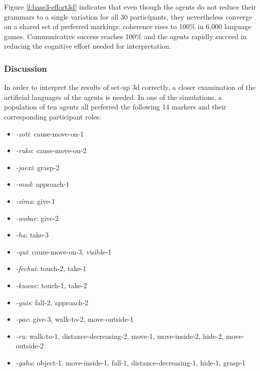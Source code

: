 Figure \ref{f:base3-effort3d} indicates that even though the agents do not reduce their grammars to a single variation for all 30 participants, they nevertheless converge on a shared set of preferred markings: coherence rises to 100\% in 6.000 language games. Communicative success reaches 100\% and the agents rapidly succeed in reducing the cognitive effort needed for interpretation. 


\subsubsection{Discussion}
 In order to interpret the results of set-up 3d correctly, a closer examination of the artificial languages of the agents is needed. In one of the simulations, a population of ten agents all preferred the following 14 markers and their corresponding participant roles:

\begin{itemize}
\item {\em -zoti}: cause-move-on-1
\item {\em -ruko}: cause-move-on-2
\item {\em -jaexi}: grasp-2
\item {\em -mad}: approach-1
\item {\em -zima}: give-1
\item {\em -wobae}: give-2
\item {\em -ha}: take-3
\item {\em -qui}: cause-move-on-3, visible-1
\item {\em -fechui}: touch-2, take-1
\item {\em -kuwae}: touch-1, take-2
\item {\em -yuis}: fall-2, approach-2
\item {\em -pae}: give-3, walk-to-2, move-outside-1
\item {\em -ru}: walk-to-1, distance-decreasing-2, move-1, move-inside-2, hide-2, move-outside-2
\item {\em -gahu}: object-1, move-inside-1, fall-1, distance-decreasing-1, hide-1, grasp-1
\end{itemize}

